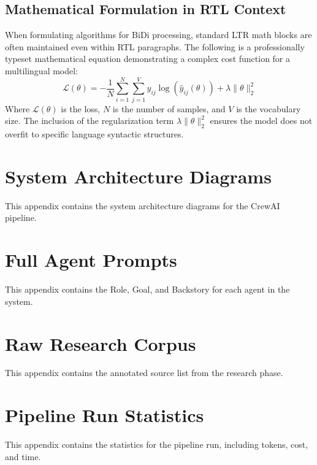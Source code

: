 \documentclass[a4paper,12pt,oneside]{memoir}
\begin{document}
\section{Mathematical Formulation in RTL Context}
When formulating algorithms for BiDi processing, standard LTR math blocks are often maintained even within RTL paragraphs. The following is a professionally typeset mathematical equation demonstrating a complex cost function for a multilingual model:
\begin{equation}
\mathcal{L}(\theta) = -\frac{1}{N} \sum_{i=1}^{N} \sum_{j=1}^{V} y_{ij} \log(\hat{y}_{ij}(\theta)) + \lambda \| \theta \|_2^2
\end{equation}
Where $\mathcal{L}(\theta)$ is the loss, $N$ is the number of samples, and $V$ is the vocabulary size. The inclusion of the regularization term $\lambda \| \theta \|_2^2$ ensures the model does not overfit to specific language syntactic structures.

\backmatter

\printbibliography[heading=bibintoc,title={References}]

\printglossaries

\printindex

\appendix
\chapter{System Architecture Diagrams}
This appendix contains the system architecture diagrams for the CrewAI pipeline.

\chapter{Full Agent Prompts}
This appendix contains the Role, Goal, and Backstory for each agent in the system.

\chapter{Raw Research Corpus}
This appendix contains the annotated source list from the research phase.

\chapter{Pipeline Run Statistics}
This appendix contains the statistics for the pipeline run, including tokens, cost, and time.
\end{document}
